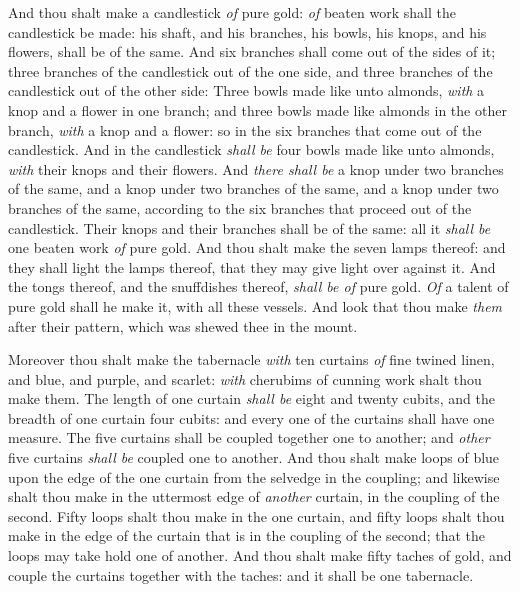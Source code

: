 \documentclass[11pt,letterpaper,oneside]{memoir}
\begin{document}
And thou shalt make a candlestick \emph{of} pure gold: \emph{of} beaten
work shall the candlestick be made: his shaft, and his branches, his
bowls, his knops, and his flowers, shall be of the same. And six
branches shall come out of the sides of it; three branches of the
candlestick out of the one side, and three branches of the candlestick
out of the other side: Three bowls made like unto almonds, \emph{with} a
knop and a flower in one branch; and three bowls made like almonds in
the other branch, \emph{with} a knop and a flower: so in the six
branches that come out of the candlestick. And in the candlestick
\emph{shall be} four bowls made like unto almonds, \emph{with} their
knops and their flowers. And \emph{there shall be} a knop under two
branches of the same, and a knop under two branches of the same, and a
knop under two branches of the same, according to the six branches that
proceed out of the candlestick. Their knops and their branches shall be
of the same: all it \emph{shall be} one beaten work \emph{of} pure gold.
And thou shalt make the seven lamps thereof: and they shall light the
lamps thereof, that they may give light over against it. And the tongs
thereof, and the snuffdishes thereof, \emph{shall be of} pure gold. \emph{Of}
a talent of pure gold shall he make it, with all these vessels. And look
that thou make \emph{them} after their pattern, which was shewed thee in
the mount.

Moreover thou shalt make the tabernacle \emph{with} ten curtains
\emph{of} fine twined linen, and blue, and purple, and scarlet:
\emph{with} cherubims of cunning work shalt thou make them. The length
of one curtain \emph{shall be} eight and twenty cubits, and the breadth
of one curtain four cubits: and every one of the curtains shall have one
measure. The five curtains shall be coupled together one to another; and
\emph{other} five curtains \emph{shall be} coupled one to another. And
thou shalt make loops of blue upon the edge of the one curtain from the
selvedge in the coupling; and likewise shalt thou make in the uttermost
edge of \emph{another} curtain, in the coupling of the second. Fifty
loops shalt thou make in the one curtain, and fifty loops shalt thou
make in the edge of the curtain that is in the coupling of the second;
that the loops may take hold one of another. And thou shalt make fifty
taches of gold, and couple the curtains together with the taches: and it
shall be one tabernacle.
\end{document}

